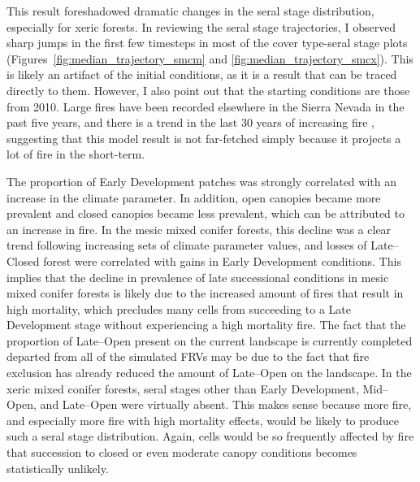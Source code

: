 This result foreshadowed dramatic changes in the seral stage distribution, especially for xeric forests. In reviewing the seral stage trajectories, I observed sharp jumps in the first few timesteps in most of the cover type-seral stage plots (Figures~\ref{fig:median_trajectory_smcm} and \ref{fig:median_trajectory_smcx}). This is likely an artifact of the initial conditions, as it is a result that can be traced directly to them. However, I also point out that the starting conditions are those from 2010. Large fires have been recorded elsewhere in the Sierra Nevada in the past five years, and there is a trend in the last 30 years of increasing fire \citep{Miller2012}, suggesting that this model result is not far-fetched simply because it projects a lot of fire in the short-term.

The proportion of Early Development patches was strongly correlated with an increase in the climate parameter. In addition, open canopies became more prevalent and closed canopies became less prevalent, which can be attributed to an increase in fire. In the mesic mixed conifer forests, this decline was a clear trend following increasing sets of climate parameter values, and losses of Late--Closed forest were correlated with gains in Early Development conditions. This implies that the decline in prevalence of late successional conditions in mesic mixed conifer forests is likely due to the increased amount of fires that result in high mortality, which precludes many cells from succeeding to a Late Development stage without experiencing a high mortality fire. The fact that the proportion of Late--Open present on the current landscape is currently completed departed from all of the simulated FRVs may be due to the fact that fire exclusion has already reduced the amount of Late--Open on the landscape. In the xeric mixed conifer forests, seral stages other than Early Development, Mid--Open, and Late--Open were virtually absent. This makes sense because more fire, and especially more fire with high mortality effects, would be likely to produce such a seral stage distribution. Again, cells would be so frequently affected by fire that succession to closed or even moderate canopy conditions becomes statistically unlikely.

